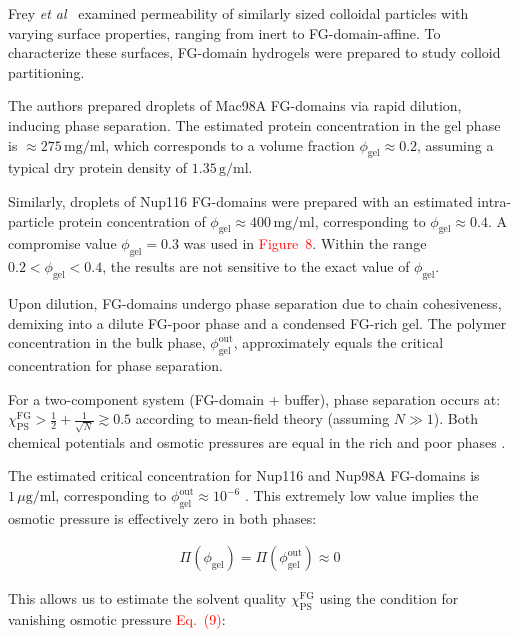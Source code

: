 \documentclass[10pt, a4paper, twocolumn]{article}
\newcommand\todo[1]{\textcolor{red}{#1}}
\begin{document}
Frey \textit{et al}~\cite{Frey2018} examined permeability of similarly sized colloidal particles with varying surface properties, ranging from inert to FG-domain-affine.
To characterize these surfaces, FG-domain hydrogels were prepared to study colloid partitioning.

The authors prepared droplets of Mac98A FG-domains via rapid dilution, inducing phase separation. 
The estimated protein concentration in the gel phase is $\approx 275 \, \text{mg}/\text{ml}$, which corresponds to a volume fraction $\phi_{\text{gel}} \approx 0.2$, assuming a typical dry protein density of $1.35 \, \text{g}/\text{ml}$.

Similarly, droplets of Nup116 FG-domains were prepared with an estimated intra-particle protein concentration of $\phi_{\text{gel}} \approx 400 \, \text{mg}/\text{ml}$, corresponding to $\phi_{\text{gel}} \approx 0.4$. A compromise value $\phi_{\text{gel}} = 0.3$ was used in \todo{Figure~8}.
Within the range $0.2 < \phi_{\text{gel}} < 0.4$, the results are not sensitive to the exact value of $\phi_{\text{gel}}$.

Upon dilution, FG-domains undergo phase separation due to chain cohesiveness, demixing into a dilute FG-poor phase and a condensed FG-rich gel.
The polymer concentration in the bulk phase, $\phi_{\text{gel}}^{\text{out}}$, approximately equals the critical concentration for phase separation.

For a two-component system (FG-domain + buffer), phase separation occurs at:
$
\chi_{\text{PS}}^{\text{FG}} > \frac{1}{2} + \frac{1}{\sqrt{N}} \gtrsim 0.5
$
according to mean-field theory (assuming $N \gg 1$). 
Both chemical potentials and osmotic pressures are equal in the rich and poor phases \cite{Vovk2016, Zilman2018}.

The estimated critical concentration for Nup116 and Nup98A FG-domains is $1 \, \mu\text{g}/\text{ml}$, corresponding to \mbox{$\phi_{\text{gel}}^{\text{out}} \approx 10^{-6}$} \cite{Schmidt2015}.
This extremely low value implies the osmotic pressure is effectively zero in both phases:

\begin{eqnarray}
    \Pi(\phi_{\text{gel}}) = \Pi(\phi_{\text{gel}}^{\text{out}}) \approx 0
\end{eqnarray}

This allows us to estimate the solvent quality $\chi_{\text{PS}}^{\text{FG}}$ using the condition for vanishing osmotic pressure \todo{Eq.~(9)}:
\end{document}
